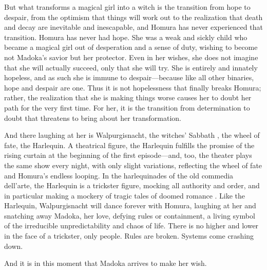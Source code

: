 But what transforms a magical girl into a witch is the transition from hope to despair, from the optimism that things will work out to the realization that death and decay are inevitable and inescapable, and Homura has never experienced that transition. Homura has never had hope. She was a weak and sickly child who became a magical girl out of desperation and a sense of duty, wishing to become not Madoka's savior but her protector. Even in her wishes, she does not imagine that she will actually succeed, only that she will try. She is entirely and innately hopeless, and as such she is immune to despair—because like all other binaries, hope and despair are one. Thus it is not hopelessness that finally breaks Homura; rather, the realization that she is making things worse causes her to doubt her path for the very first time. For her, it is the transition from determination to doubt that threatens to bring about her transformation.

And there laughing at her is Walpurgisnacht, the witches' Sabbath \cite{ref85}, the wheel of fate, the Harlequin. A theatrical figure, the Harlequin fulfills the promise of the rising curtain at the beginning of the first episode—and, too, the theater plays the same show every night, with only slight variations, reflecting the wheel of fate and Homura's endless looping. In the harlequinades of the old commedia dell'arte, the Harlequin is a trickster figure, mocking all authority and order, and in particular making a mockery of tragic tales of doomed romance \cite{ref86}. Like the Harlequin, Walpurgisnacht will dance forever with Homura, laughing at her and snatching away Madoka, her love, defying rules or containment, a living symbol of the irreducible unpredictability and chaos of life. There is no higher and lower in the face of a trickster, only people. Rules are broken. Systems come crashing down.

And it is in this moment that Madoka arrives to make her wish.
